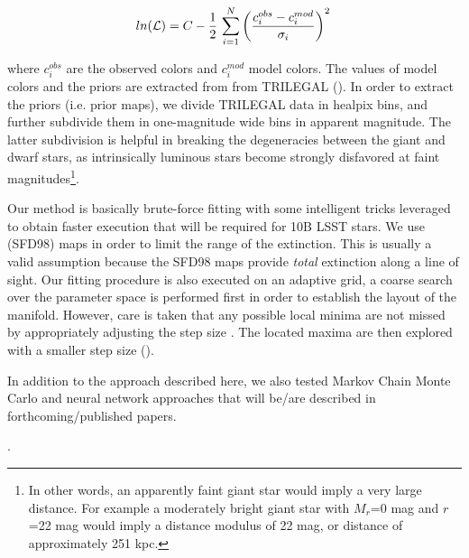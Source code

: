 \begin{equation}
	ln (\mathcal{L}) = C - {1 \over 2} \,\sum_{i=1}^N \left({ c^{obs}_i - c^{mod}_i  \over \sigma_i } \right)^2 \,
\end{equation}

where \ensuremath{c^{obs}_i} are the observed colors and \ensuremath{c^{mod}_i} model colors. The values of model colors and the priors are extracted from from TRILEGAL (\citet{dal_tio_simulating_2022}). In order to extract the priors (i.e. prior maps), we divide TRILEGAL data in healpix bins, and further subdivide them in one-magnitude wide bins in apparent magnitude. The latter subdivision is helpful in breaking the degeneracies between the giant and dwarf stars, as intrinsically luminous stars become strongly disfavored at faint magnitudes\footnote{In other words, an apparently faint giant star would imply a very large distance. For example a moderately bright giant star with \ensuremath{M_r}=0 mag and \ensuremath{r}=22 mag would imply a distance modulus of 22 mag, or distance of approximately 251 kpc.}.


Our method is basically brute-force fitting with some intelligent tricks leveraged to obtain faster execution that will be required for 10B LSST stars. We use \cite{schlegel_maps_1998} (SFD98) maps in order to limit the range of the extinction. This is usually a valid assumption because the SFD98 maps provide \textit{total} extinction along a line of sight. Our fitting procedure is also executed on an adaptive grid, a coarse search over the parameter space is performed first in order to establish the layout of the manifold. However, care is taken that any possible local minima are not missed by appropriately adjusting the step size . The located maxima are then explored with a smaller step size ().

In addition to the approach described here, we also tested Markov Chain Monte Carlo and neural network approaches that will be/are described in forthcoming/published papers.


.

